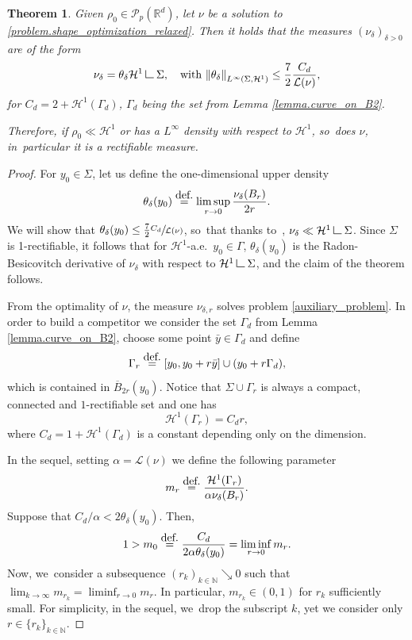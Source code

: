 \documentclass[11pt]{article}
\numberwithin{equation}{section}
\newtheorem{theorem}{Theorem}[section]
\theoremstyle{definition}
\newcommand{\eqdef}{\ensuremath{\stackrel{\mbox{\upshape\tiny def.}}{=}}}
\newcommand{\norm}[1]{\left\lVert#1\right\rVert}
\newcommand\LM[1]{\hbox{\vrule width.5pt \vbox to#1pt{\vfill \hrule width#1pt height.5pt}}}
\newcommand\LL{{\mathchoice {\>\LM7\>}{\>\LM7\>}{\,\LM5\,}{\,\LM{3.35}\,}}}
\newcommand{\mres}{\LL}
\newcommand\cH{\mathcal{H}}
\newcommand\cL{\mathcal{L}}
\newcommand{\RR}{\mathbb{R}}
\begin{document}
\begin{theorem}\label{theorem.solutions_are_absolutely_continuous}
Given $\rho_0 \in \mathcal{P}_p(\RR^d)$, let $\nu$ be a solution to \eqref{problem.shape_optimization_relaxed}.
Then it holds that the measures $\left(\nu_\delta\right)_{\delta > 0}$ are of the form
\[
\nu_\delta = \theta_\delta \cH^1\mres \Sigma,
\quad\text{with $
\norm{\theta_\delta}_{L^\infty(\Sigma, \cH^1)}
\le
\frac{7}{2}\frac{C_d}{\mathcal{L}(\nu)}$,}
\]
for $C_d = 2 + \cH^1(\Gamma_d)$, $\Gamma_d$ being the set from Lemma \ref{lemma.curve_on_B2}.

Therefore,
if $\rho_0 \ll \cH^1$ or has a $L^{\infty}$ density with respect to $\cH^1$, so~does $\nu$, in~particular it is a rectifiable measure.
\end{theorem}

\begin{proof}
For $y_0 \in \Sigma$, let us define the one-dimensional upper density~\cite[Def.\,2.55]{ambrosio2000functions}
\begin{equation*}
\theta_\delta(y_0)\eqdef\limsup_{r \to 0} \frac{\nu_{\delta}(B_r)}{2r}.
\end{equation*}
We will show that $\theta_{\delta}(y_0)\leq \frac{7}{2}\sfrac{C_d}{\cL(\nu)}$, so~that thanks to~\cite[Th.\,2.56]{ambrosio2000functions}, $\nu_\delta \ll \cH^1\mres\Sigma$.
Since $\Sigma$ is 1-rectifiable, it follows that for $\cH^1$-a.e.~$y_0 \in \Gamma$, $\theta_\delta(y_0)$ is the Radon-Besicovitch
derivative of $\nu_\delta$ with respect to $\cH^1\mres\Sigma$, and the claim of the theorem follows.

From the optimality of $\nu$, the measure $\nu_{\delta,r}$ solves problem \eqref{auxiliary_problem}. In order to build a competitor we consider the set $\Gamma_d$ from Lemma \ref{lemma.curve_on_B2}, choose some point $\bar y \in \Gamma_d$ and define
\[
\Gamma_r
\eqdef
[y_0, y_0 + r\bar y]\cup
(y_0 + r\Gamma_d),
\]
which is contained in $\overline{B}_{2r}(y_0)$. Notice that $\Sigma \cup \Gamma_{r}$ is always a compact, connected and $1$-rectifiable set and one has
\[
\cH^1(\Gamma_{r})
=
C_dr,
\]
where $C_d = 1 + \cH^1(\Gamma_d)$ is a constant depending only on the dimension.

In the sequel, setting $\alpha = \mathcal{L}(\nu)$ we define the following parameter
\[
m_{r} \eqdef
\frac{\cH^1(\Gamma_r)}{\alpha \nu_\delta(B_r)}.\]
Suppose that $C_d/\alpha < 2\theta_{\delta}(y_0)$. Then,
\begin{equation*}
1> m_0\eqdef\frac{C_d}{2\alpha\theta_\delta(y_0)}= \liminf_{r \to 0} m_r.
\end{equation*}
Now, we~consider a subsequence $(r_{k})_{k\in \mathbb{N}}\searrow 0$ such that $\lim_{k \to \infty} m_{r_k}=\liminf_{r \to 0} m_r$. In particular, $m_{r_k} \in (0,1)$ for $r_k$ sufficiently small.
For simplicity, in the sequel, we~drop the subscript $k$, yet we consider only $r \in \{r_{k}\}_{k\in \mathbb{N}}$.


\end{proof}
\end{document}

